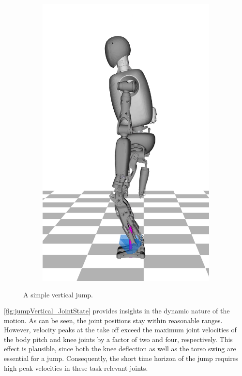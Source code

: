 \begin{figure}[h!]
\begin{subfigure}{.16\textwidth}
	\includegraphics[width=1\linewidth]{fig/jumpVertical/snaps/6x}
	\caption{}
\end{subfigure}%
\caption{A simple vertical jump.}
\label{fig:jumpVertical_Snaps}
\end{figure} 

\cref{fig:jumpVertical_JointState} provides insights in the dynamic nature of the motion. As can be seen, the joint positions stay within reasonable ranges. However, velocity peaks at the take off exceed the maximum joint velocities of the body pitch and knee joints by a factor of two and four, respectively. This effect is plausible, since both the knee deflection as well as the torso swing are essential for a jump. Consequently, the short time horizon of the jump requires high peak velocities in these task-relevant joints. 

